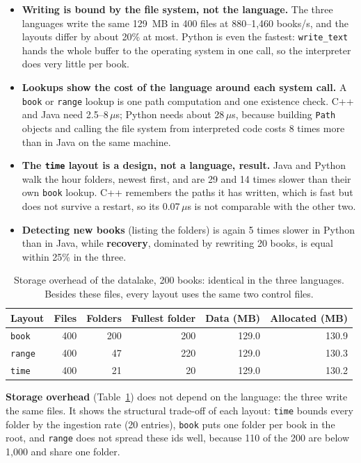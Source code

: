\documentclass[11pt,a4paper]{article}
\newcommand{\code}[1]{\texttt{#1}}
\newcommand{\us}{\,$\mu$s}
\begin{document}
\begin{itemize}
  \item \textbf{Writing is bound by the file system, not the language.} The three languages write the
        same 129~MB in 400 files at 880--1,460 books/s, and the layouts differ by about 20\% at most.
        Python is even the fastest: \code{write\_text} hands the whole buffer to the operating system
        in one call, so the interpreter does very little per book.
  \item \textbf{Lookups show the cost of the language around each system call.} A \code{book} or
        \code{range} lookup is one path computation and one existence check. C++ and Java need
        2.5--8\us{}; Python needs about 28\us, because building \code{Path} objects and calling the
        file system from interpreted code costs 8 times more than in Java on the same machine.
  \item \textbf{The \code{time} layout is a design, not a language, result.} Java and Python walk the
        hour folders, newest first, and are 29 and 14 times slower than their own \code{book}
        lookup. C++ remembers the paths it has written, which is fast but does not survive a restart,
        so its 0.07\us{} is not comparable with the other two.
  \item \textbf{Detecting new books} (listing the folders) is again 5 times slower in Python than in
        Java, while \textbf{recovery}, dominated by rewriting 20 books, is equal within 25\% in the three.
\end{itemize}

\begin{table}[H]
\centering\small
\begin{tabular}{@{}lrrrrr@{}}
\toprule
Layout & Files & Folders & Fullest folder & Data (MB) & Allocated (MB) \\
\midrule
\code{book} & 400 & 200 & 200 & 129.0 & 130.9 \\
\code{range} & 400 & 47 & 220 & 129.0 & 130.3 \\
\code{time} & 400 & 21 & 20 & 129.0 & 130.2 \\
\bottomrule
\end{tabular}
\caption{Storage overhead of the datalake, 200 books: identical in the three languages. Besides these
files, every layout uses the same two control files.}
\label{tab:storage}
\end{table}

\textbf{Storage overhead} (Table~\ref{tab:storage}) does not depend on the language: the three write
the same files. It shows the structural trade-off of each layout: \code{time} bounds every folder by
the ingestion rate (20 entries), \code{book} puts one folder per book in the root, and \code{range}
does not spread these ids well, because 110 of the 200 are below 1,000 and share one folder.
\end{document}
